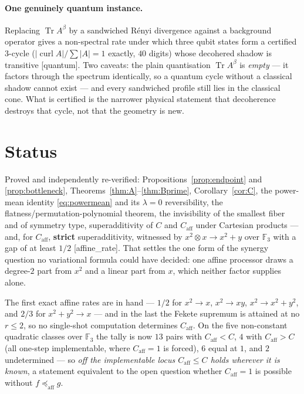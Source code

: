 \documentclass[11pt]{article}
\theoremstyle{plain}
\theoremstyle{remark}
\newcommand{\F}{\mathbb F}
\newcommand{\impl}{\preccurlyeq}
\newcommand{\caff}{C_{\mathrm{aff}}}
\newcommand{\ra}{\rightarrow}
\newcommand{\source}[1]{{\normalfont\small\textsf{[#1]}}}
\begin{document}
\paragraph{One genuinely quantum instance.}
Replacing $\operatorname{Tr}A^\beta$ by a sandwiched R\'enyi divergence against
a background operator gives a non-spectral rate under which three qubit states
form a certified $3$-cycle
($|\operatorname{curl}A|/\sum|A| = 1$ exactly, $40$ digits) whose decohered
shadow is transitive \source{quantum}.  Two caveats: the plain quantisation
$\operatorname{Tr}A^\beta$ is \emph{empty} --- it factors through the spectrum
identically, so a quantum cycle without a classical shadow cannot exist --- and
every sandwiched profile still lies in the classical cone.  What is certified is
the narrower physical statement that decoherence destroys that cycle, not that
the geometry is new.

\section{Status}

Proved and independently re-verified: Propositions~\ref{prop:endpoint} and
\ref{prop:bottleneck}, Theorems~\ref{thm:A}--\ref{thm:Bprime},
Corollary~\ref{cor:C}, the power-mean identity \eqref{eq:powermean} and its
$\lambda = 0$ reversibility, the flatness/permutation-polynomial theorem, the
invisibility of the smallest fiber and of symmetry type, superadditivity of $C$
and $\caff$ under Cartesian products --- and, for $\caff$, \textbf{strict}
superadditivity, witnessed by $x^2 \otimes x \ra x^2+y$ over $\F_3$ with a gap of
at least $1/2$ \source{affine\_rate}.  That settles the one form of the synergy
question no variational formula could have decided: one affine processor draws a
degree-$2$ part from $x^2$ and a linear part from $x$, which neither factor
supplies alone.

The first exact affine rates are in hand --- $1/2$ for $x^2\ra x$, $x^2\ra xy$,
$x^2\ra x^2+y^2$, and $2/3$ for $x^2+y^2\ra x$ --- and in the last the Fekete
supremum is attained at no $r \le 2$, so no single-shot computation determines
$\caff$.  On the five non-constant quadratic classes over $\F_3$ the tally is now
$13$ pairs with $\caff < C$, $4$ with $\caff > C$ (all one-step implementable,
where $\caff = 1$ is forced), $6$ equal at $1$, and $2$ undetermined --- so
\emph{off the implementable locus $\caff \le C$ holds wherever it is known}, a
statement equivalent to the open question whether $\caff = 1$ is possible
without $f \impl_{\mathrm{aff}} g$.
\end{document}
